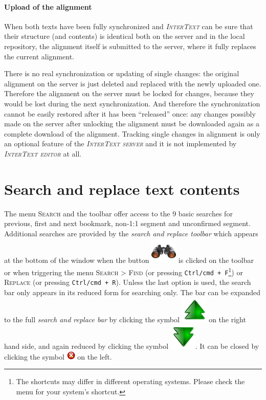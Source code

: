 \documentclass[a4paper,10pt,oneside]{book}
\newcommand{\IT}{\textit{\textsc{InterText}}\xspace}
\newcommand{\ITeditor}{\textit{\textsc{InterText editor}}\xspace}
\newcommand{\ITserver}{\textit{\textsc{InterText server}}\xspace}
\newcommand{\keys}[1]{\texttt{#1}}
\newcommand{\menu}[1]{\textsc{#1}}
\begin{document}
\subsubsection{Upload of the alignment}\label{ch:detail:managing_remote:sync:alupload}

When both texts have been fully synchronized and \IT can be sure that their structure (and contents) is identical both on the server and in the local repository, the alignment itself is submitted to the server, where it fully replaces the current alignment.

There is no real synchronization or updating of single changes: the original alignment on the server is just deleted and replaced with the newly uploaded one. Therefore the alignment on the server must be locked for changes, because they would be lost during the next synchronization. And therefore the synchronization cannot be easily restored after it has been ``released'' once: any changes possibly made on the server after unlocking the alignment must be downloaded again as a complete download of the alignment. Tracking single changes in alignment is only an optional feature of the \ITserver and it is not implemented by \ITeditor at all.

\chapter{Search and replace text contents}\label{ch:detail:search_replace}

The menu \menu{Search} and the toolbar offer access to the 9 basic searches for previous, first and next bookmark, non-1:1 segment and unconfirmed segment. Additional searches are provided by the \emph{search and replace toolbar} which appears at the bottom of the window when the button \includegraphics[height=2ex]{../images/48/search.png} is clicked on the toolbar or when triggering the menu \menu{Search} > \menu{Find} (or pressing \keys{Ctrl/cmd + F}\footnote{The shortcuts may differ in different operating systems. Please check the menu for your system's shortcut.}) or \menu{Replace} (or pressing \keys{Ctrl/cmd + R}). Unless the last option is used, the search bar only appears in its reduced form for searching only. The bar can be expanded to the full \emph{search and replace bar} by clicking the symbol \includegraphics[height=2ex]{../images/48/arrow-up-double.png} on the right hand side, and again reduced by clicking the symbol \includegraphics[height=2ex]{../images/48/arrow-down-double.png}. It can be closed by clicking the symbol \includegraphics[height=2ex]{../images/16/close.png} on the left.
\end{document}
